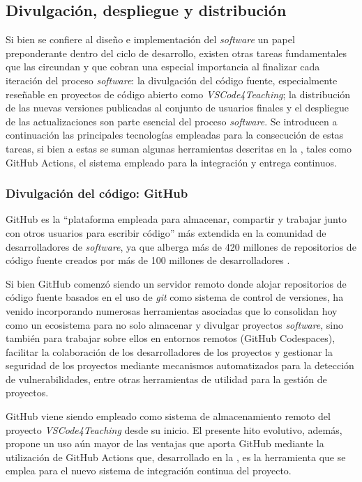 \subsection{Divulgación, despliegue y distribución}
\label{subsec:tecDivulgDistribDeploy}

Si bien se confiere al diseño e implementación del \textit{software} un papel preponderante dentro del ciclo de desarrollo, existen otras tareas fundamentales que las circundan y que cobran una especial importancia al finalizar cada iteración del proceso \textit{software}: la divulgación del código fuente, especialmente reseñable en proyectos de código abierto como \textit{VSCode4Teaching}; la distribución de las nuevas versiones publicadas al conjunto de usuarios finales y el despliegue de las actualizaciones son parte esencial del proceso \textit{software}. Se introducen a continuación las principales tecnologías empleadas para la consecución de estas tareas, si bien a estas se suman algunas herramientas descritas en la , tales como GitHub Actions, el sistema empleado para la integración y entrega continuos.

\subsubsection{Divulgación del código: GitHub}
\label{subsec:tecGitHub}
GitHub es la ``plataforma empleada para almacenar, compartir y trabajar junto con otros usuarios para escribir código'' \cite{GitHub} más extendida en la comunidad de desarrolladores de \textit{software}, ya que alberga más de 420 millones de repositorios de código fuente creados por más de 100 millones de desarrolladores \cite{GitHubCifras}.

Si bien GitHub comenzó siendo un servidor remoto donde alojar repositorios de código fuente basados en el uso de \textit{git} como sistema de control de versiones, ha venido incorporando numerosas herramientas asociadas que lo consolidan hoy como un ecosistema para no solo almacenar y divulgar proyectos \textit{software}, sino también para trabajar sobre ellos en entornos remotos (GitHub Codespaces), facilitar la colaboración de los desarrolladores de los proyectos y gestionar la seguridad de los proyectos mediante mecanismos automatizados para la detección de vulnerabilidades, entre otras herramientas de utilidad para la gestión de proyectos.

GitHub viene siendo empleado como sistema de almacenamiento remoto del proyecto \textit{VSCode4Teaching} desde su inicio. El presente hito evolutivo, además, propone un uso aún mayor de las ventajas que aporta GitHub mediante la utilización de GitHub Actions que, desarrollado en la , es la herramienta que se emplea para el nuevo sistema de integración continua del proyecto.

